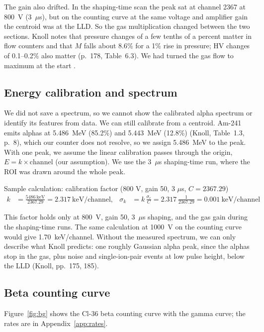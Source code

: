 \documentclass[12pt]{article}
\begin{document}
The gain also drifted. In the shaping-time scan the peak sat at channel 2367 at 800~V (3~$\mu$s), but on the counting curve at the same voltage and amplifier gain the centroid was at the LLD. So the gas multiplication changed between the two sections. Knoll notes that pressure changes of a few tenths of a percent matter in flow counters and that $M$ falls about 8.6\% for a 1\% rise in pressure; HV changes of 0.1--0.2\% also matter (p.~178, Table~6.3). We had turned the gas flow to maximum at the start \cite{labmanual}.

\subsection{Energy calibration and spectrum}

We did not save a spectrum, so we cannot show the calibrated alpha spectrum or identify its features from data. We can still calibrate from a centroid. Am-241 emits alphas at 5.486~MeV (85.2\%) and 5.443~MeV (12.8\%) (Knoll, Table~1.3, p.~8), which our counter does not resolve, so we assign 5.486~MeV to the peak. With one peak, we assume the linear calibration passes through the origin, $E = k \times \text{channel}$ (our assumption). We use the 3~$\mu$s shaping-time run, where the ROI was drawn around the whole peak.

\begin{samplecalc}{Sample calculation: calibration factor (800 V, gain 50, 3 $\mu$s, $C = 2367.29$)}
\begin{align*}
k &= \frac{5486\ \text{keV}}{2367.29} = 2.317\ \text{keV/channel}, &
\sigma_k &= k\,\frac{\sigma_c}{C} = 2.317\,\frac{1}{2367.29} = 0.001\ \text{keV/channel}
\end{align*}
\end{samplecalc}

This factor holds only at 800~V, gain 50, 3~$\mu$s shaping, and the gas gain during the shaping-time runs. The same calculation at 1000~V on the counting curve would give 1.70~keV/channel. Without the measured spectrum, we can only describe what Knoll predicts: one roughly Gaussian alpha peak, since the alphas stop in the gas, plus noise and single-ion-pair events at low pulse height, below the LLD (Knoll, pp.~175, 185).

\subsection{Beta counting curve}

Figure~\ref{fig:bg} shows the Cl-36 beta counting curve with the gamma curve; the rates are in Appendix~\ref{app:rates}.
\end{document}
